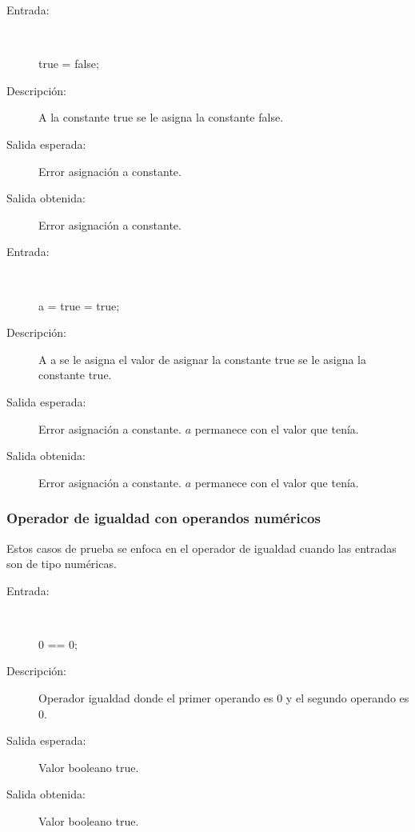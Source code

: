 	\begin{description}
		\item [Entrada:] \hfill \\
\begin{myverbatim}
 true = false;
\end{myverbatim}
		\item [Descripción:] A la constante true se le asigna la constante false.
		\item [Salida esperada:] Error asignación a constante.
		\item [Salida obtenida:] Error asignación a constante.
	\end{description}

	\begin{description}
		\item [Entrada:] \hfill \\
\begin{myverbatim}
 a = true = true;
\end{myverbatim}
		\item [Descripción:] A a se le asigna el valor de asignar la constante true se le asigna la constante true.
		\item [Salida esperada:] Error asignación a constante. $a$ permanece con el valor que tenía.
		\item [Salida obtenida:] Error asignación a constante. $a$ permanece con el valor que tenía.
	\end{description}


\subsubsection{Operador de igualdad con operandos numéricos}
Estos casos de prueba se enfoca en el operador de igualdad cuando las entradas son de tipo numéricas.

	\begin{description}
		\item [Entrada:] \hfill \\
\begin{myverbatim}
 0 == 0;
\end{myverbatim}
		\item [Descripción:] Operador igualdad donde el primer operando es 0 y el segundo operando es  0.
		\item [Salida esperada:] Valor booleano true.
		\item [Salida obtenida:] Valor booleano true.
	\end{description}

